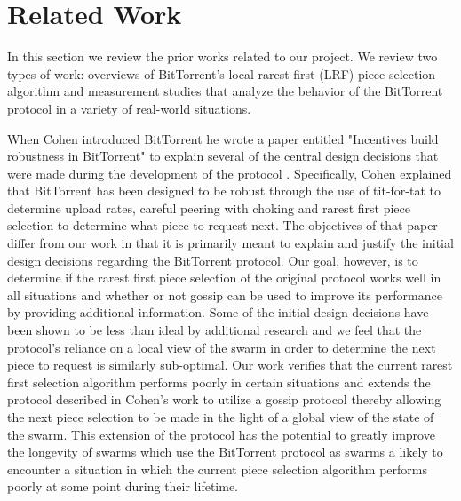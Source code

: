 \section{Related Work}

In this section we review the prior works related to our project. We
review two types of work: overviews of BitTorrent's local rarest first
(LRF) piece selection algorithm and measurement studies that analyze the
behavior of the BitTorrent protocol in a variety of real-world situations.

When Cohen introduced BitTorrent he wrote a paper entitled "Incentives
build robustness in BitTorrent" to explain several of the central
design decisions that were made during the development of the protocol
\cite{cohen:1}. Specifically, Cohen explained that BitTorrent has been designed to be
robust through the use of tit-for-tat to determine upload rates,  careful
peering with choking and rarest first piece selection to determine what
piece to request next. The objectives of that paper differ from our work
in that it is primarily meant to explain and justify the initial design
decisions regarding the BitTorrent protocol. Our goal, however,  is to
determine if the rarest first piece selection of the original protocol
works well in all situations and whether or not gossip can be used to
improve its performance by providing additional information. Some of
the initial design decisions have been shown to be less than ideal by
additional research \cite{levin} \cite{bittyrant} and  we feel that the protocol's reliance
on a local view of the swarm in order to determine the next piece to
request is similarly sub-optimal. Our work verifies that the current
rarest first selection algorithm performs poorly in certain situations
and extends the protocol described in Cohen's work to utilize a gossip
protocol thereby allowing the next piece selection to be made in the
light of a global view of the state of the swarm. This extension of the
protocol has the potential to greatly improve the longevity of swarms
which use the BitTorrent protocol as swarms a likely to encounter a
situation in which the current piece selection algorithm performs poorly
at some point during their lifetime.

